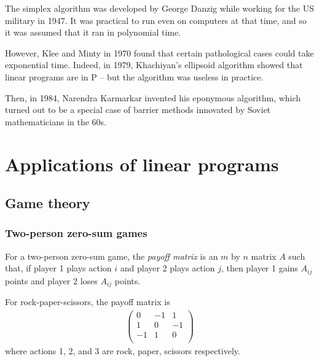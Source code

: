 \documentclass{../../template/note}
\begin{document}
    \begin{remark*}
        The simplex algorithm was developed by George Danzig while working for the US military in 1947. It was practical to run even on computers at that time, and so it was assumed that it ran in polynomial time.

        However, Klee and Minty in 1970 found that certain pathological cases could take exponential time. Indeed, in 1979, Khachiyan's ellipsoid algorithm showed that linear programs are in P -- but the algorithm was useless in practice.

        Then, in 1984, Narendra Karmarkar invented his eponymous algorithm, which turned out to be a special case of barrier methods innovated by Soviet mathematicians in the 60s.
    \end{remark*}

    \section{Applications of linear programs}

    \subsection{Game theory}

    \subsubsection{Two-person zero-sum games}

    \begin{definition}
        For a two-person zero-sum game, the \emph{payoff matrix} is an $m$ by $n$ matrix $A$ such that, if player 1 plays action $i$ and player 2 plays action $j$, then player 1 gains $A_{ij}$ points and player 2 loses $A_{ij}$ points.
    \end{definition}
    
    \begin{example*}
        For rock-paper-scissors, the payoff matrix is
        \begin{align*}
            \begin{pmatrix}
                0 & -1 & 1 \\
                1 & 0 & -1 \\
                -1 & 1 & 0 \\
            \end{pmatrix}
        \end{align*}
        where actions 1, 2, and 3 are rock, paper, scissors respectively.        
    \end{example*}
    
\end{document}
